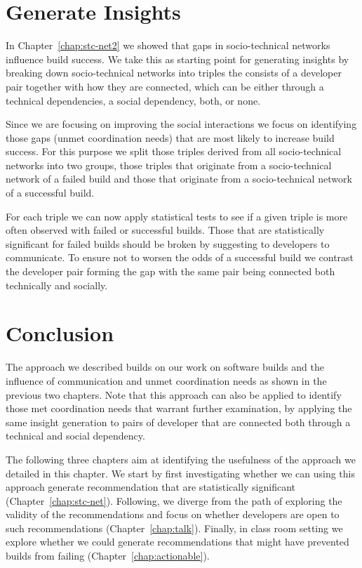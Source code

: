 \section{Generate Insights}
In Chapter~\ref{chap:stc-net2} we showed that gaps in socio-technical networks influence build success.
We take this as starting point for generating insights by breaking down socio-technical networks into triples the consists of a developer pair together with how they are connected, which can be either through a technical dependencies, a social dependency, both, or none.

Since we are focusing on improving the social interactions we focus on identifying those gaps (unmet coordination needs) that are most likely to increase build success.
For this purpose we split those triples derived from all socio-technical networks into two groups, those triples that originate from a socio-technical network of a failed build and those that originate from a socio-technical network of a successful build.

For each triple we can now apply statistical tests to see if a given triple is more often observed with failed or successful builds.
Those that are statistically significant for failed builds should be broken by suggesting to developers to communicate.
To ensure not to worsen the odds of a successful build we contrast the developer pair forming the gap with the same pair being connected both technically and socially.

\section{Conclusion}
The approach we described builds on our work on software builds and the influence of communication and unmet coordination needs as shown in the previous two chapters.
Note that this approach can also be applied to identify those met coordination needs that warrant further examination, by applying the same insight generation to pairs of developer that are connected both through a technical and social dependency.

The following three chapters aim at identifying the usefulness of the approach we detailed in this chapter.
We start by first investigating whether we can using this approach generate recommendation that are statistically significant (Chapter~\ref{chap:stc-net}).
Following, we diverge from the path of exploring the validity of the recommendations and focus on whether developers are open to such recommendations (Chapter~\ref{chap:talk}).
Finally, in class room setting we explore whether we could generate recommendations that might have prevented builds from failing (Chapter~\ref{chap:actionable}).